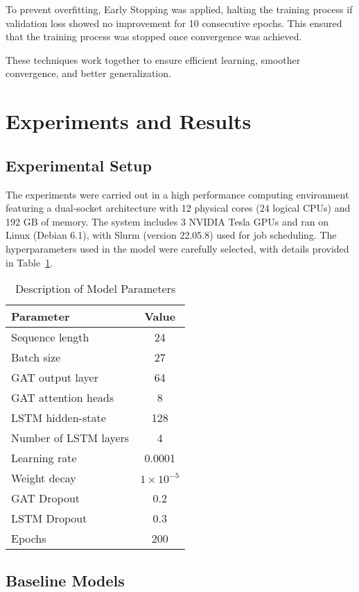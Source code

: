\documentclass[sigconf,nonacm]{acmart}
\begin{document}
To prevent overfitting, Early Stopping was applied, halting the training process if validation loss showed no improvement for 10 consecutive epochs. This ensured that the training process was stopped once convergence was achieved.

These techniques work together to ensure efficient learning, smoother convergence, and better generalization. 


\section{Experiments and Results}
\label{sec:experiments} 
\subsection{Experimental Setup}

The experiments were carried out in a high performance computing environment featuring a dual-socket architecture with 12 physical cores (24 logical CPUs) and 192 GB of memory. The system includes 3 NVIDIA Tesla GPUs and ran on Linux (Debian 6.1), with Slurm (version 22.05.8) used for job scheduling. The hyperparameters used in the model were carefully selected, with details provided in Table~\ref{tab:model_parameters}.

\begin{table}[h!]
  \caption{Description of Model Parameters}
  \label{tab:model_parameters}
  \centering
  \begin{tabular}{lc}
    \toprule
    \textbf{Parameter} & \textbf{Value} \\
    \midrule
    Sequence length & 24 \\
    Batch size & 27 \\
    GAT output layer & 64 \\
    GAT attention heads & 8 \\
    LSTM hidden-state & 128 \\
    Number of LSTM layers & 4 \\
    Learning rate & 0.0001 \\
    Weight decay & $1 \times 10^{-5}$ \\
    GAT Dropout & 0.2 \\
    LSTM Dropout & 0.3 \\
    Epochs & 200 \\
    \bottomrule
  \end{tabular}
\end{table}


\subsection{Baseline Models}
\end{document}
